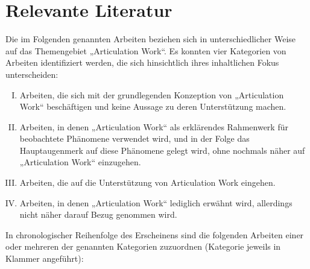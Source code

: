 
\section{Relevante Literatur} %
\label{sec:relevante_literatur}

Die im Folgenden genannten Arbeiten beziehen sich in unterschiedlicher Weise auf das Themengebiet „Articulation Work“. Es konnten vier Kategorien von Arbeiten identifiziert werden, die sich hinsichtlich ihres inhaltlichen Fokus unterscheiden:
\begin{enumerate}[(I)]
	\item Arbeiten, die sich mit der grundlegenden Konzeption von „Articulation Work“ beschäftigen und keine Aussage zu deren Unterstützung machen.
	\item Arbeiten, in denen „Articulation Work“ als erklärendes Rahmenwerk für beobachtete Phänomene verwendet wird, und in der Folge das Hauptaugenmerk auf diese Phänomene gelegt wird, ohne nochmals näher auf „Articulation Work“ einzugehen.
	\item Arbeiten, die auf die Unterstützung von Articulation Work eingehen.
	\item Arbeiten, in denen „Articulation Work“ lediglich erwähnt wird, allerdings nicht näher darauf Bezug genommen wird.
\end{enumerate}

In chronologischer Reihenfolge des Erscheinens sind die folgenden Arbeiten einer oder mehreren der genannten Kategorien zuzuordnen (Kategorie jeweils in Klammer angeführt):

